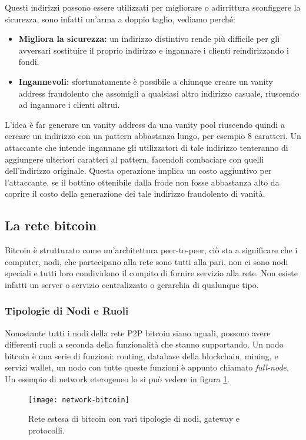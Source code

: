 Questi indirizzi possono essere utilizzati per migliorare o adirrittura sconfiggere la sicurezza, sono infatti un'arma a doppio taglio, vediamo perché:
\begin{itemize}
	\item \textbf{Migliora la sicurezza:} un indirizzo distintivo rende più difficile per gli avversari sostituire il proprio indirizzo e ingannare i clienti reindirizzando i fondi.
	\item \textbf{Ingannevoli:} sfortunatamente è possibile a chiunque creare un vanity address fraudolento che assomigli a qualsiasi altro indirizzo casuale, riuscendo ad ingannare i clienti altrui.
\end{itemize}
L'idea è far generare un vanity address da una vanity pool riuscendo quindi a cercare un indirizzo con un pattern abbastanza lungo, per esempio 8 caratteri. Un attaccante che intende ingannane gli utilizzatori di tale indirizzo tenteranno di aggiungere ulteriori caratteri al pattern, facendoli combaciare con quelli dell'indirizzo originale. Questa operazione implica un costo aggiuntivo per l'attaccante, se il bottino ottenibile dalla frode non fosse abbastanza alto da coprire il costo della generazione dei tale indirizzo fraudolento di vanità.

\subsection{La rete bitcoin}
Bitcoin è strutturato come un'architettura peer-to-peer, ciò sta a significare che i computer, nodi, che partecipano alla rete sono tutti alla pari, non ci sono nodi speciali e tutti loro condividono il compito di fornire servizio alla rete. Non esiste infatti un server o servizio centralizzato o gerarchia di qualunque tipo.

\subsubsection{Tipologie di Nodi e Ruoli}
Nonostante tutti i nodi della rete P2P bitcoin siano uguali, possono avere differenti ruoli a seconda della funzionalità che stanno supportando. Un nodo bitcoin è una serie di funzioni: routing, database della blockchain, mining, e servizi wallet, un nodo con tutte queste funzioni è appunto chiamato \textit{full-node}. Un esempio di network eterogeneo lo si può vedere in figura \ref{fig:network-bitcoin}.
\begin{figure}
	\centering 
	\texttt{[image: network-bitcoin]} 
	\caption[Network bitcoin]{Rete estesa di bitcoin con vari tipologie di nodi, gateway e protocolli.}
	\label{fig:network-bitcoin} 
\end{figure}

